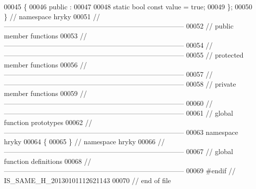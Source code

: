 \begin{DoxyCode}
00045 \{
00046 \textcolor{keyword}{public} :
00047 
00048     \textcolor{keyword}{static} \textcolor{keywordtype}{bool} \textcolor{keyword}{const} value = \textcolor{keyword}{true};
00049 \};
00050 \} \textcolor{comment}{// namespace hryky}
00051 \textcolor{comment}{//
      ------------------------------------------------------------------------------}
00052 \textcolor{comment}{// public member functions}
00053 \textcolor{comment}{//
      ------------------------------------------------------------------------------}
00054 \textcolor{comment}{//
      ------------------------------------------------------------------------------}
00055 \textcolor{comment}{// protected member functions}
00056 \textcolor{comment}{//
      ------------------------------------------------------------------------------}
00057 \textcolor{comment}{//
      ------------------------------------------------------------------------------}
00058 \textcolor{comment}{// private member functions}
00059 \textcolor{comment}{//
      ------------------------------------------------------------------------------}
00060 \textcolor{comment}{//
      ------------------------------------------------------------------------------}
00061 \textcolor{comment}{// global function prototypes}
00062 \textcolor{comment}{//
      ------------------------------------------------------------------------------}
00063 \textcolor{keyword}{namespace }hryky
00064 \{
00065 \} \textcolor{comment}{// namespace hryky}
00066 \textcolor{comment}{//
      ------------------------------------------------------------------------------}
00067 \textcolor{comment}{// global function definitions}
00068 \textcolor{comment}{//
      ------------------------------------------------------------------------------}
00069 \textcolor{preprocessor}{#endif // IS\_SAME\_H\_20130101112621143}
00070 \textcolor{preprocessor}{}\textcolor{comment}{// end of file}
\end{DoxyCode}
